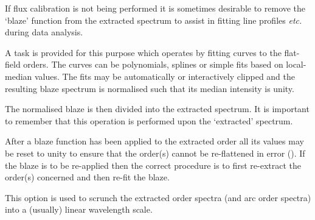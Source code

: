 If flux calibration is not being performed it is sometimes desirable to
remove the `blaze' function from the extracted spectrum to assist in
fitting line profiles {\it etc.} during data analysis.

A task is provided for this purpose which operates by fitting curves
to the flat-field orders.  The curves can be polynomials, splines or
simple fits based on local-median values.  The fits may be automatically or
interactively clipped and the resulting blaze spectrum is normalised such
that its median intensity is unity.

The normalised blaze is then divided into the extracted spectrum. It is
important to remember that this operation is performed upon the `extracted'
spectrum.

After a blaze function has been applied to the extracted order all its
values may be reset to unity to ensure that the order(s) cannot be
re-flattened in error
().  If the
blaze is to be re-applied then the correct procedure is to first
re-extract the order(s) concerned and then re-fit the blaze.






This option is used to scrunch the extracted order spectra (and arc order
spectra) into a (usually) linear wavelength scale.

